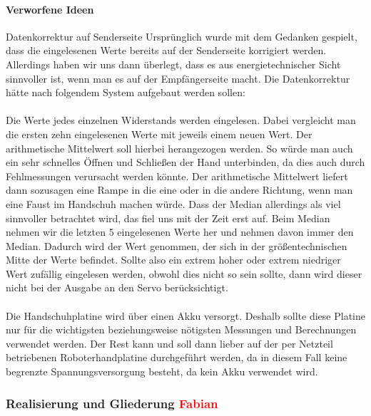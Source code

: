 \documentclass[titlepage,12pt,twoside]{article}
\begin{document}
\paragraph{Verworfene Ideen}
\hfill \break
\hfill \break
Datenkorrektur auf Senderseite
Ursprünglich wurde mit dem Gedanken gespielt, dass die eingelesenen Werte bereits auf der Senderseite korrigiert werden. 
Allerdings haben wir uns dann überlegt, dass es aus energietechnischer Sicht sinnvoller ist, wenn man es auf der Empfängerseite 
macht. Die Datenkorrektur hätte nach folgendem System aufgebaut werden sollen: \\
\\
Die Werte jedes einzelnen Widerstands werden eingelesen. Dabei vergleicht man die ersten zehn eingelesenen Werte mit jeweils 
einem neuen Wert. Der arithmetische Mittelwert soll hierbei herangezogen werden. So würde man auch ein sehr schnelles Öffnen 
und Schließen der Hand unterbinden, da dies auch durch Fehlmessungen verursacht werden könnte. Der arithmetische Mittelwert 
liefert dann sozusagen eine Rampe in die eine oder in die andere Richtung, wenn man eine Faust im Handschuh machen würde. Dass 
der Median allerdings als viel sinnvoller betrachtet wird, das fiel uns mit der Zeit erst auf. Beim Median nehmen wir die 
letzten 5 eingelesenen Werte her und nehmen davon immer den Median. Dadurch wird der Wert genommen, der sich in der 
größentechnischen Mitte der Werte befindet. Sollte also ein extrem hoher oder extrem niedriger Wert zufällig eingelesen werden, 
obwohl dies nicht so sein sollte, dann wird dieser nicht bei der Ausgabe an den Servo berücksichtigt. \\
\\
Die Handschuhplatine wird über einen Akku versorgt. Deshalb sollte diese Platine nur für die wichtigsten beziehungsweise 
nötigsten Messungen und Berechnungen verwendet werden. Der Rest kann und soll dann lieber auf der per Netzteil betriebenen 
Roboterhandplatine durchgeführt werden, da in diesem Fall keine begrenzte Spannungsversorgung besteht, da kein Akku verwendet 
wird.
\\
\subsubsection{Realisierung und Gliederung \textcolor{red}{Fabian}}
\end{document}
